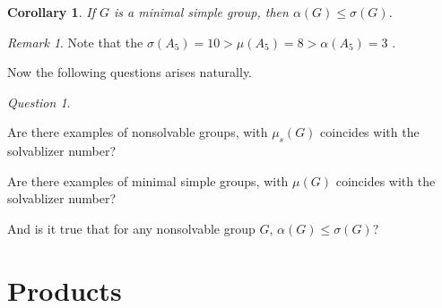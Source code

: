 \documentclass{amsart}
\newcommand{\ws}{\mu_s}
\newtheorem{corollary}[theorem]{Corollary}
\theoremstyle{definition}
\theoremstyle{remark}
\newtheorem{remark}[theorem]{Remark}
\newtheorem{question}[theorem]{Question}
\begin{document}
\begin{corollary}
    If $G$ is a minimal simple group, then $\alpha(G)\le \sigma(G)$.
\end{corollary}
\begin{remark}
 Note that the  $\sigma(A_5)=10>\mu(A_5)=8>\alpha(A_5)= 3$ \cite{GKS}.
\end{remark}

Now the following questions arises naturally.
\begin{question}
\

Are there examples of  nonsolvable groups, with $\ws(G)$ coincides with the solvablizer number?

Are there examples of  minimal simple groups, with $\mu(G)$ coincides with the solvablizer number?

And is it true that for any nonsolvable group $G$,  $\alpha(G)\le \sigma(G)$? 
\end{question}

\section{Products}
\end{document}
